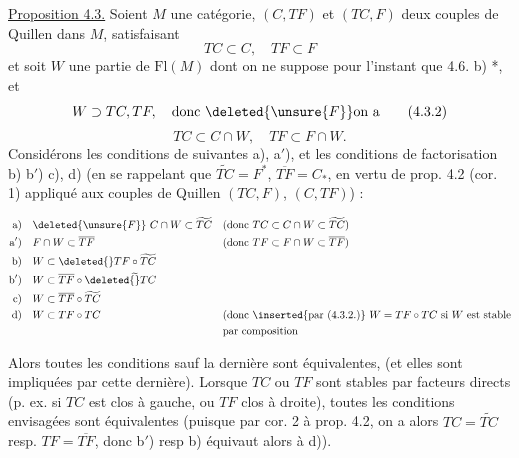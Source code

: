 \uline{Proposition 4.3.} Soient $M$ une catégorie, $(C,TF)$ et
$(TC,F)$ deux couples de Quillen dans $M$, satisfaisant
\[
TC\subset C,\quad TF\subset F
\tag*{(4.3.1.)}
\]
et soit $W$ une partie de $\mathrm{Fl}(M)$ dont on ne
suppose pour l'instant que 4.6. b) *, et
\[
W\supset TC,TF,\quad\text{donc }\deleted{\unsure{F}}\text{on a}
\tag*{(4.3.2)}
\]
\[
TC\subset C\cap W,\quad TF\subset F\cap W.
\tag*{(4.3.3)}
\]
Considérons les conditions de   suivantes
a), a$'$), et les conditions de factorisation b) b$'$) c), d)
(en se rappelant que $\widetilde{TC}=F^*$, $\overline{TF}=C_*$, en
vertu de prop. 4.2 (cor. 1) appliqué aux couples de
Quillen $(TC,F)$, $(C,TF)$) :

\[
\begin{aligned}
\text{a)}\quad &\deleted{\unsure{F}}\ C\cap W\subset\widetilde{TC}
&&(\text{donc }TC\subset C\cap W\subset\widetilde{TC})\\
\text{a$'$)}\quad &F\cap W\subset\overline{TF}
&&(\text{donc }TF\subset F\cap W\subset\overline{TF})\\
\text{b)}\quad &W\subset\deleted{\overline{\vphantom{TF}}}TF\circ\widetilde{TC}\\
\text{b$'$)}\quad &W\subset\overline{TF}\circ\deleted{\widetilde{\vphantom{TC}}}TC\\
\text{c)}\quad &W\subset\overline{TF}\circ\widetilde{TC}\\
\text{d)}\quad &W\subset TF\circ TC&&(\text{donc }\inserted{\text{par (4.3.2.)}}\ W=TF\circ TC\text{ si }W\text{ est stable}\\
&&&\text{par composition}
\end{aligned}
\]

Alors toutes les conditions sauf la dernière sont
équivalentes, (et elles sont  impliquées par cette dernière).
 Lorsque $TC$ ou $TF$ sont stables par facteurs directs
(p. ex. si $TC$ est clos à gauche, ou $TF$ clos à droite),
toutes les conditions envisagées sont équivalentes
(puisque par cor. 2 à prop. 4.2, on a alors $TC=\widetilde{TC}$
resp. $TF=\overline{TF}$, donc b$'$) resp b) équivaut alors à
d)).

